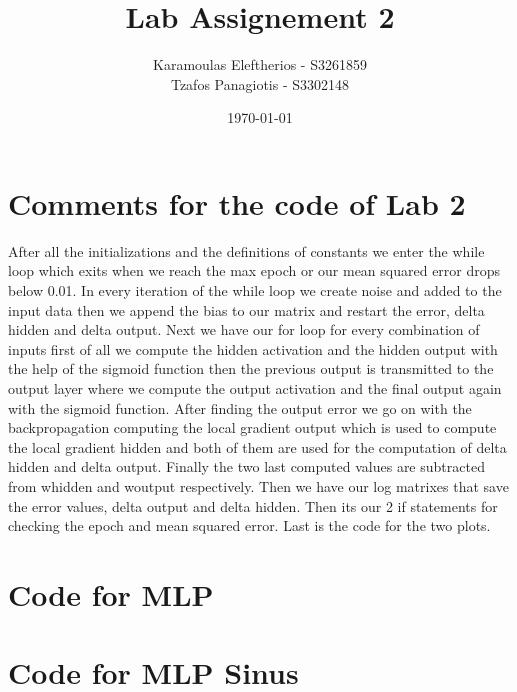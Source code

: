 \documentclass{article}
\title{Lab Assignement 2}
\date{\today}
\author{
	Karamoulas Eleftherios - S3261859\\
	Tzafos Panagiotis - S3302148\\
}
\begin{document}
\maketitle
\section{Comments for the code of Lab 2}
After all the initializations and the definitions of constants we enter the while loop which exits when we reach the max epoch or our mean squared error drops below 0.01. In every iteration of the while loop we create noise and added to the input data then we append the bias to our matrix and restart the error, delta hidden and delta output. Next we have our for loop for every combination of inputs first of all we compute the hidden activation and the hidden output with the help of the sigmoid function then the previous output is transmitted to the output layer where we compute the output activation and the final output again with the sigmoid function. After finding the output error we go on with the backpropagation computing the local gradient output which is used to compute the local gradient hidden and both of them are used for the computation of delta hidden and delta output. Finally the two last computed values are subtracted from whidden and woutput respectively. Then we have our log matrixes that save the error values, delta output and delta hidden. Then its our 2 if statements for checking the epoch and mean squared error. Last is the code for the two plots.
\section{Code for MLP}
\begin{enumerate}



\end{enumerate}
\section{Code for MLP Sinus}


\end{document}
